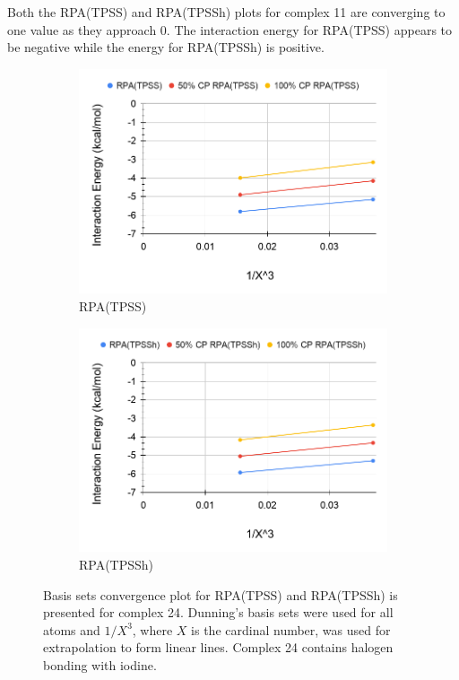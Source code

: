 \documentclass[11pt]{article}
\begin{document}
Both the RPA(TPSS) and RPA(TPSSh) plots for complex 11 are converging
to one value as they approach 0. The interaction energy for RPA(TPSS)
appears to be negative while the energy for RPA(TPSSh) is positive.


\begin{figure}[H]
  \centering
  \begin{subfigure}{.5\textwidth}
    \centering
    \includegraphics[scale=0.3]{tpss-24.png}
    \caption{RPA(TPSS)}
    \label{fig:tpss_24}
  \end{subfigure}%
  \begin{subfigure}{.5\textwidth}
    \centering
    \includegraphics[scale=0.3]{tpssh-24.png}
    \caption{RPA(TPSSh)}
    \label{fig:tpssh_24}
  \end{subfigure}
  \caption{Basis sets convergence plot for RPA(TPSS) and RPA(TPSSh) is
    presented for complex 24. Dunning's basis sets were used for all
    atoms and $1/X^3$, where $X$ is the cardinal number, was used for
    extrapolation to form linear lines. Complex 24 contains halogen 
    bonding with iodine.}
  \label{fig:complex_24}
\end{figure}
\end{document}
